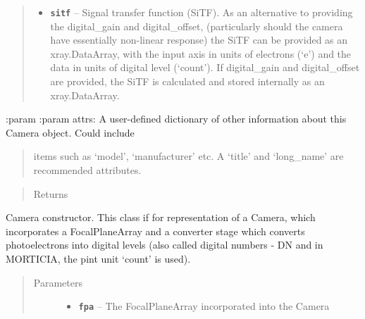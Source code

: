 \documentclass[a4paper,10pt,english]{sphinxmanual}
\begin{document}
\begin{fulllineitems}
\begin{quote}
\begin{description}
\begin{itemize}
\item {} 
\textbf{\texttt{sitf}} -- Signal transfer function (SiTF). As an alternative to providing the digital\_gain and
digital\_offset, (particularly should the camera have essentially non-linear response) the SiTF
can be provided as an xray.DataArray, with the input axis in units of electrons (`e') and
the data in units of digital level (`count'). If digital\_gain and digital\_offset are provided,
the SiTF is calculated and stored internally as an xray.DataArray.

\end{itemize}

\end{description}\end{quote}

:param
:param attrs: A user-defined dictionary of other information about this Camera object. Could include
\begin{quote}

items such as `model', `manufacturer' etc. A `title' and `long\_name' are recommended attributes.
\end{quote}
\begin{quote}\begin{description}
\item[{Returns}] \leavevmode


\end{description}\end{quote}

\begin{fulllineitems}
\label{packages:electro.Camera.__init__}
Camera constructor. This class if for representation of a Camera, which incorporates
a FocalPlaneArray and a converter stage which converts photoelectrons into digital levels (also called
digital numbers - DN and in MORTICIA, the pint unit `count' is used).
\begin{quote}\begin{description}
\item[{Parameters}] \leavevmode\begin{itemize}
\item {} 
\textbf{\texttt{fpa}} -- The FocalPlaneArray incorporated into the Camera


\end{itemize}
\end{description}
\end{quote}
\end{fulllineitems}
\end{fulllineitems}
\end{document}
